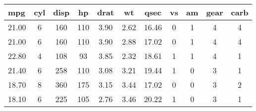 \begin{tabular}{lcccccccccc}
\hline
\textbf{mpg} & \textbf{cyl} & \textbf{disp} & \textbf{hp} & \textbf{drat} & \textbf{wt} & \textbf{qsec} & \textbf{vs} & \textbf{am} & \textbf{gear} & \textbf{carb} \\
\hline
21.00 & 6 & 160 & 110 & 3.90 & 2.62 & 16.46 & 0 & 1 & 4 & 4\\
21.00 & 6 & 160 & 110 & 3.90 & 2.88 & 17.02 & 0 & 1 & 4 & 4\\
22.80 & 4 & 108 & 93 & 3.85 & 2.32 & 18.61 & 1 & 1 & 4 & 1\\
21.40 & 6 & 258 & 110 & 3.08 & 3.21 & 19.44 & 1 & 0 & 3 & 1\\
18.70 & 8 & 360 & 175 & 3.15 & 3.44 & 17.02 & 0 & 0 & 3 & 2\\
18.10 & 6 & 225 & 105 & 2.76 & 3.46 & 20.22 & 1 & 0 & 3 & 1\\
\hline
\end{tabular}
